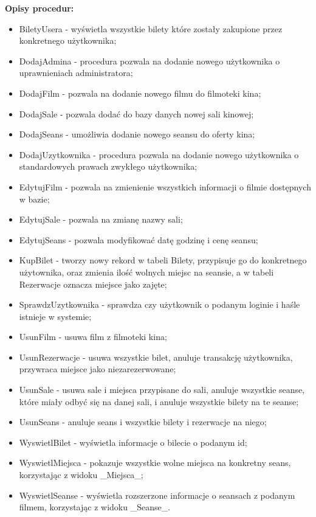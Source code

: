 \textbf{Opisy procedur:}
\begin{itemize}
	\item BiletyUsera - wyświetla wszystkie bilety które zostały zakupione przez konkretnego użytkownika;
	\item DodajAdmina - procedura pozwala na dodanie nowego użytkownika o uprawnieniach administratora;
	\item DodajFilm - pozwala na dodanie nowego filmu do filmoteki kina;
	\item DodajSale - pozwala dodać do bazy danych nowej sali kinowej;
	\item DodajSeans - umożliwia dodanie nowego seansu do oferty kina;
	\item DodajUzytkownika - procedura pozwala na dodanie nowego użytkownika o standardowych prawach zwykłego użytkownika;
	\item EdytujFilm - pozwala na zmienienie wszystkich informacji o filmie dostępnych w bazie;
	\item EdytujSale - pozwala na zmianę nazwy sali;
	\item EdytujSeans - pozwala modyfikować datę godzinę i cenę seansu;
	\item KupBilet - tworzy nowy rekord w tabeli Bilety, przypisuje go do konkretnego użytownika, oraz zmienia ilość wolnych miejsc na seansie, a w tabeli Rezerwacje oznacza miejsce jako zajęte;
	\item SprawdzUzytkownika - sprawdza czy użytkownik o podanym loginie i haśle istnieje w systemie;
	\item UsunFilm - usuwa film z filmoteki kina;
	\item UsunRezerwacje - usuwa wszystkie bilet, anuluje transakcję użytkownika, przywraca miejsce jako niezarezerwowane;
	\item UsunSale - usuwa sale i miejsca przypisane do sali, anuluje wszystkie seanse, które miały odbyć się na danej sali, i anuluje wszystkie bilety na te seanse;
	\item UsunSeans - anuluje seans i wszystkie bilety i rezerwacje na niego;
	\item WyswietlBilet - wyświetla informacje o bilecie o podanym id;
	\item WyswietlMiejsca - pokazuje wszystkie wolne miejsca na konkretny seans, korzystając z widoku \_Miejsca\_;
	\item WyswietlSeanse - wyświetla rozszerzone informacje o seansach z podanym filmem, korzystając z widoku \_Seanse\_.
\end{itemize}

